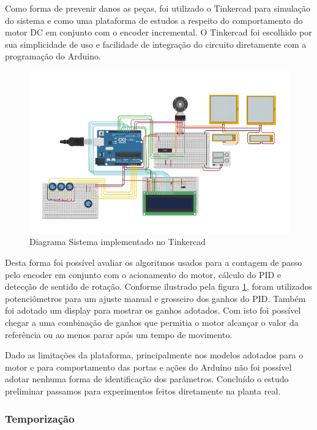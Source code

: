 \documentclass[a4paper,11pt]{article}
\begin{document}
Como forma de prevenir danos as peças, foi utilizado o Tinkercad para simulação do sistema e como uma plataforma de estudos a respeito do comportamento do motor DC em conjunto com o encoder incremental. O Tinkercad foi escolhido por sua simplicidade de uso e facilidade de integração do circuito diretamente com a programação do Arduino.

\begin{figure}[H]
    \centering
    \includegraphics[width=\linewidth]{src/tex/img/pid_tinkercad.png}
    \caption{Diagrama Sistema implementado no Tinkercad}
    \label{fig:pid_tinkercad}
\end{figure}

Desta forma foi possível avaliar os algoritmos usados para a contagem de passo pelo encoder em conjunto com o acionamento do motor, cálculo do PID e detecção de sentido de rotação. Conforme ilustrado pela figura \ref{fig:pid_tinkercad}, foram utilizados potenciômetros para um ajuste manual e grosseiro dos ganhos do PID. Também foi adotado um display para mostrar os ganhos adotados. Com isto foi possível chegar a uma combinação de ganhos que permitia o motor alcançar o valor da referência ou ao menos parar após um tempo de movimento.

Dado as limitações da plataforma, principalmente nos modelos adotados para o motor e para comportamento das portas e ações do Arduíno não foi possível adotar nenhuma forma de identificação dos parâmetros. Concluído o estudo preliminar passamos para experimentos feitos diretamente na planta real.

\subsubsection{Temporização}
\end{document}
